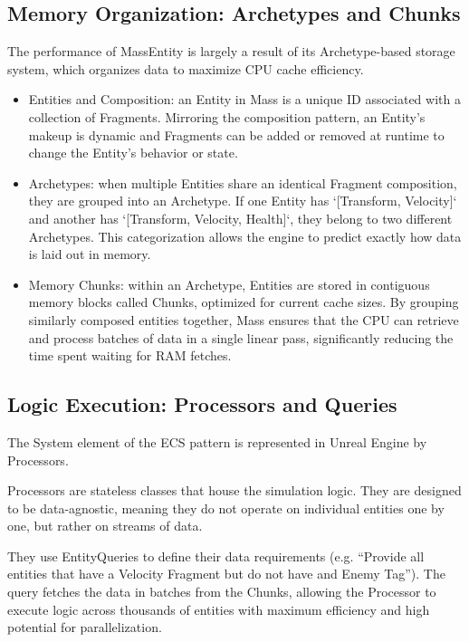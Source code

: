 \subsection{Memory Organization: Archetypes and Chunks}

The performance of MassEntity is largely a result of its Archetype-based storage system, which organizes data to maximize CPU cache efficiency.

\begin{itemize}
    \item Entities and Composition: an Entity in Mass is a unique ID associated with a collection of Fragments. Mirroring the composition pattern, an Entity’s makeup is dynamic and Fragments can be added or removed at runtime to change the Entity’s behavior or state.
    \item Archetypes: when multiple Entities share an identical Fragment composition, they are grouped into an Archetype. If one Entity has `[Transform, Velocity]` and another has `[Transform, Velocity, Health]`, they belong to two different Archetypes. This categorization allows the engine to predict exactly how data is laid out in memory.
    \item Memory Chunks: within an Archetype, Entities are stored in contiguous memory blocks called Chunks, optimized for current cache sizes. By grouping similarly composed entities together, Mass ensures that the CPU can retrieve and process batches of data in a single linear pass, significantly reducing the time spent waiting for RAM fetches.
\end{itemize}

\subsection{Logic Execution: Processors and Queries}

The System element of the ECS pattern is represented in Unreal Engine by Processors.

Processors are stateless classes that house the simulation logic. They are designed to be data-agnostic, meaning they do not operate on individual entities one by one, but rather on streams of data.

They use EntityQueries to define their data requirements (e.g. “Provide all entities that have a Velocity Fragment but do not have and Enemy Tag”). The query fetches the data in batches from the Chunks, allowing the Processor to execute logic across thousands of entities with maximum efficiency and high potential for parallelization.

